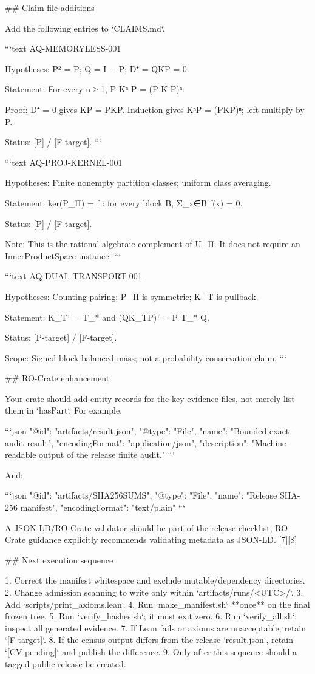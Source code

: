## Claim file additions

Add the following entries to `CLAIMS.md`.

```text
AQ-MEMORYLESS-001

Hypotheses:
P² = P; Q = I − P; D⁺ = QKP = 0.

Statement:
For every n ≥ 1,
P Kⁿ P = (P K P)ⁿ.

Proof:
D⁺ = 0 gives KP = PKP. Induction gives
KⁿP = (PKP)ⁿ; left-multiply by P.

Status:
[P] / [F-target].
```

```text
AQ-PROJ-KERNEL-001

Hypotheses:
Finite nonempty partition classes; uniform class averaging.

Statement:
ker(P_Π) =
{f : for every block B, Σ_{x∈B} f(x) = 0}.

Status:
[P] / [F-target].

Note:
This is the rational algebraic complement of U_Π. It does not require
an InnerProductSpace instance.
```

```text
AQ-DUAL-TRANSPORT-001

Hypotheses:
Counting pairing; P_Π is symmetric; K_T is pullback.

Statement:
K_Tᵀ = T_* and (QK_TP)ᵀ = P T_* Q.

Status:
[P-target] / [F-target].

Scope:
Signed block-balanced mass; not a probability-conservation claim.
```

## RO-Crate enhancement

Your crate should add entity records for the key evidence files, not merely list them in `hasPart`. For example:

```json
{
  "@id": "artifacts/result.json",
  "@type": "File",
  "name": "Bounded exact-audit result",
  "encodingFormat": "application/json",
  "description": "Machine-readable output of the release finite audit."
}
```

And:

```json
{
  "@id": "artifacts/SHA256SUMS",
  "@type": "File",
  "name": "Release SHA-256 manifest",
  "encodingFormat": "text/plain"
}
```

A JSON-LD/RO-Crate validator should be part of the release checklist; RO-Crate guidance explicitly recommends validating metadata as JSON-LD. [7][8]

## Next execution sequence

1. Correct the manifest whitespace and exclude mutable/dependency directories.
2. Change admission scanning to write only within `artifacts/runs/<UTC>/`.
3. Add `scripts/print_axioms.lean`.
4. Run `make_manifest.sh` **once** on the final frozen tree.
5. Run `verify_hashes.sh`; it must exit zero.
6. Run `verify_all.sh`; inspect all generated evidence.
7. If Lean fails or axioms are unacceptable, retain `[F-target]`.
8. If the census output differs from the release `result.json`, retain `[CV-pending]` and publish the difference.
9. Only after this sequence should a tagged public release be created.

